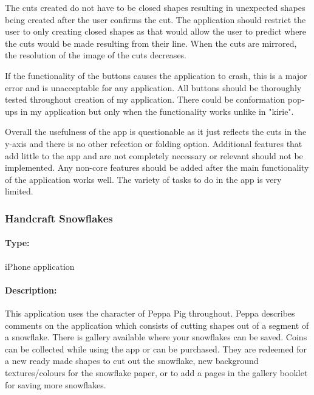 \documentclass[11pt]{article}
\begin{document}
                The cuts created do not have to be closed shapes resulting in unexpected shapes being created after the user confirms the cut. The application should restrict the user to only creating closed shapes as that would allow the user to predict where the cuts would be made resulting from their line. When the cuts are mirrored, the resolution of the image of the cuts decreases.
               
                If the functionality of the buttons causes the application to crash, this is a major error and is unacceptable for any application. All buttons should be thoroughly tested throughout creation of my application. There could be conformation pop-ups in my application but only when the functionality works unlike in "kirie". 
                
                Overall the usefulness of the app is questionable as it just reflects the cuts in the y-axis and there is no other refection or folding option. Additional features that add little to the app and are not completely necessary or relevant should not be implemented. Any non-core features should be added after the main functionality of the application works well. The variety of tasks to do in the app is very limited.
                
                
                 \subsubsection{Handcraft Snowflakes}
            
                \paragraph{Type:} iPhone application 

                \paragraph{Description:}
                This application uses the character of Peppa Pig throughout. Peppa describes comments on the application which consists of cutting shapes out of a segment of a snowflake. There is gallery available where your snowflakes can be saved. Coins can be collected while using the app or can be purchased. They are redeemed for a new ready made shapes to cut out the snowflake, new background textures/colours for the snowflake paper, or to add a pages in the gallery booklet for saving more snowflakes. 
\end{document}
